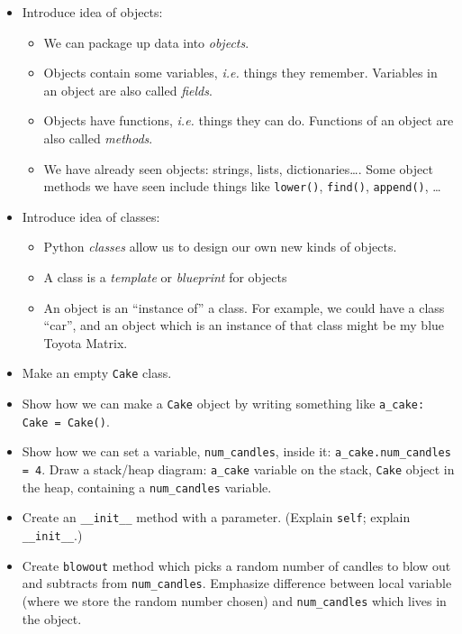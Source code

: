 \documentclass{article}
\begin{document}
\begin{itemize}
\item Introduce idea of objects:
  \begin{itemize}
  \item We can package up data into \emph{objects}.
  \item Objects contain some variables, \emph{i.e.} things they
    remember.  Variables in an object are also called \emph{fields}.
  \item Objects have functions, \emph{i.e.} things they can
    do. Functions of an object are also called \emph{methods}.
  \item We have already seen objects: strings, lists,
    dictionaries\dots.  Some object methods we have seen include
    things like \verb|lower()|, \verb|find()|, \verb|append()|, \dots
  \end{itemize}
\item Introduce idea of classes:
  \begin{itemize}
  \item Python \emph{classes} allow us to design our own new kinds of
    objects.
  \item A class is a \emph{template} or \emph{blueprint} for objects
  \item An object is an ``instance of'' a class.  For example,
    we could have a class ``car'', and an object which is an instance
    of that class might be my blue Toyota Matrix.
  \end{itemize}
\item Make an empty \verb|Cake| class.
\item Show how we can make a \verb|Cake| object by writing something
  like \verb|a_cake: Cake = Cake()|.
\item Show how we can set a variable, \verb|num_candles|, inside it:
  \verb|a_cake.num_candles = 4|. Draw a stack/heap diagram:
  \verb|a_cake| variable on the stack, \verb|Cake| object in the heap,
  containing a \verb|num_candles| variable.
\item Create an \verb|__init__| method with a parameter. (Explain
  \verb|self|; explain \verb|__init__|.)
\item Create \verb|blowout| method which picks a random number of
  candles to blow out and subtracts from \verb|num_candles|.
  Emphasize difference between local variable (where we store the
  random number chosen) and \verb|num_candles| which lives in the
  object.
\end{itemize}
\end{document}
